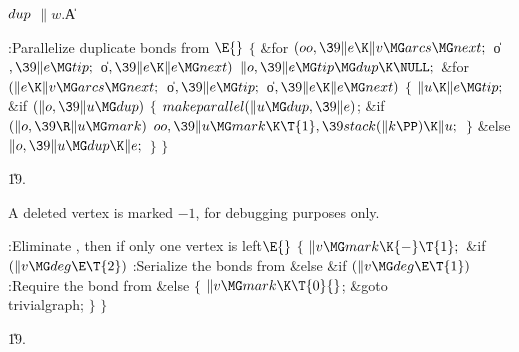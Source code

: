 \B\D$\\{dup}$ \5
$\|w.{}$\|A\par
\Y\B\4:Parallelize duplicate bonds from \X${}\E{}$\6
${}\{{}$\1\6
\&{for} ${}(\\{oo},\39\|e\K\|v\MG\\{arcs}\MG\\{next};{}$ \|o${},\39\|e\MG%
\\{tip};{}$ \|o${},\39\|e\K\|e\MG\\{next}){}$\1\5
${}\|o,\39\|e\MG\\{tip}\MG\\{dup}\K\NULL;{}$\2\6
\&{for} ${}(\|e\K\|v\MG\\{arcs}\MG\\{next};{}$ \|o${},\39\|e\MG\\{tip};{}$ %
\|o${},\39\|e\K\|e\MG\\{next}){}$\5
${}\{{}$\1\6
${}\|u\K\|e\MG\\{tip};{}$\6
\&{if} ${}(\|o,\39\|u\MG\\{dup}){}$\5
${}\{{}$\1\6
${}\\{makeparallel}(\|u\MG\\{dup},\39\|e){}$;\6
\&{if} ${}(\|o,\39\R\|u\MG\\{mark}){}$\1\5
${}\\{oo},\39\|u\MG\\{mark}\K\T{1},\39\\{stack}(\|k\PP)\K\|u;{}$\2\6
\4${}\}{}$\5
\2\&{else}\1\5
${}\|o,\39\|u\MG\\{dup}\K\|e;{}$\2\6
\4${}\}{}$\2\6
\4${}\}{}$\2\par
\U19.\fi

A deleted vertex is marked $-1$, for debugging purposes
only.

\Y\B\4:Eliminate , then  if only one
vertex is left\X${}\E{}$\6
${}\{{}$\1\6
${}\|v\MG\\{mark}\K{-}\T{1};{}$\6
\&{if} ${}(\|v\MG\\{deg}\E\T{2}){}$\1\5
:Serialize the bonds from \X\2\6
\&{else} \&{if} ${}(\|v\MG\\{deg}\E\T{1}){}$\1\5
:Require the bond from \X\2\6
\&{else}\5
${}\{{}$\1\6
${}\|v\MG\\{mark}\K\T{0}{}$;\6
\&{goto} \\{trivialgraph};\6
\4${}\}{}$\2\6
\4${}\}{}$\2\par
\U19.\fi

